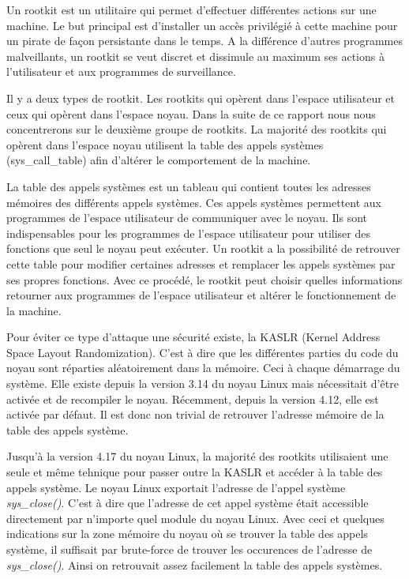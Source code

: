 \documentclass[journal, a4paper]{IEEEtran}
\begin{document}
Un rootkit est un utilitaire qui permet d'effectuer différentes actions sur une machine. Le but principal est d'installer un accès privilégié à cette machine pour un pirate de façon persistante dans le temps. A la différence d'autres programmes malveillants, un rootkit se veut discret et dissimule au maximum ses actions à l'utilisateur et aux programmes de surveillance.

Il y a deux types de rootkit. Les rootkits qui opèrent dans l'espace utilisateur et ceux qui opèrent dans l'espace noyau. Dans la suite de ce rapport nous nous concentrerons sur le deuxième groupe de rootkits. La majorité des rootkits qui opèrent dans l'espace noyau utilisent la table des appels systèmes (sys\_call\_table) afin d'altérer le comportement de la machine.

La table des appels systèmes est un tableau qui contient toutes les adresses mémoires des différents appels systèmes. Ces appels systèmes permettent aux programmes de l'espace utilisateur de communiquer avec le noyau. Ils sont indispensables pour les programmes de l'espace utilisateur pour utiliser des fonctions que seul le noyau peut exécuter. Un rootkit a la possibilité de retrouver cette table pour modifier certaines adresses et remplacer les appels systèmes par ses propres fonctions. Avec ce procédé, le rootkit peut choisir quelles informations retourner aux programmes de l'espace utilisateur et altérer le fonctionnement de la machine.

Pour éviter ce type d'attaque une sécurité existe, la  KASLR (Kernel Address Space Layout Randomization). C'est à dire que les différentes parties du code du noyau sont réparties aléatoirement dans la mémoire. Ceci à chaque démarrage du système. Elle existe depuis la version 3.14 du noyau Linux mais nécessitait d'être activée et de recompiler le noyau. Récemment, depuis la version 4.12, elle est activée par défaut. Il est donc non trivial de retrouver l'adresse mémoire de la table des appels système.

Jusqu'à la version 4.17 du noyau Linux, la majorité des rootkits utilisaient une seule et même tehnique pour passer outre la KASLR et accéder à la table des appels système. Le noyau Linux exportait l'adresse de l'appel système \textit{sys\_close()}. C'est à dire que l'adresse de cet appel système était accessible directement par n'importe quel module du noyau Linux. Avec ceci et quelques indications sur la zone mémoire du noyau où se trouver la table des appels système, il suffisait par brute-force de trouver les occurences de l'adresse de \textit{sys\_close()}. Ainsi on retrouvait assez facilement la table des appels systèmes.
\end{document}
